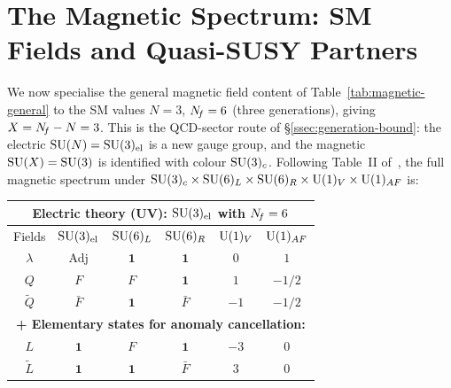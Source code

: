 \documentclass[11pt,a4paper]{article}
\begin{document}
\section{The Magnetic Spectrum: SM Fields and Quasi-SUSY Partners}
\label{sec:magnetic-spectrum}

We now specialise the general magnetic field content of
Table~\ref{tab:magnetic-general} to the SM values $N = 3$, $N_{\!f} = 6$
(three generations), giving $X = N_{\!f} - N = 3$.  This is the QCD-sector
route of \S\ref{ssec:generation-bound}: the electric
$\mathrm{SU}(N) = \mathrm{SU}(3)_{\mathrm{el}}$ is a new gauge group, and the magnetic
$\mathrm{SU}(X) = \mathrm{SU}(3)$ is identified with colour $\mathrm{SU}(3)_c$.
Following Table~II of~\cite{CacciapagliaSannino2024}, the full
magnetic spectrum under $\mathrm{SU}(3)_c \times \mathrm{SU}(6)_L \times \mathrm{SU}(6)_R
\times \mathrm{U}(1)_V \times \mathrm{U}(1)_{AF}$ is:

\begin{center}
\renewcommand{\arraystretch}{1.3}
\begin{tabular}{c c c c c c}
\toprule
\multicolumn{6}{c}{\textbf{Electric theory (UV): $\mathrm{SU}(3)_{\mathrm{el}}$ with $N_{\!f} = 6$}} \\
\midrule
Fields & $\mathrm{SU}(3)_{\mathrm{el}}$ & $\mathrm{SU}(6)_L$ & $\mathrm{SU}(6)_R$ & $\mathrm{U}(1)_V$ & $\mathrm{U}(1)_{AF}$ \\
\midrule
$\lambda$ & Adj & $\mathbf{1}$ & $\mathbf{1}$ & $0$ & $1$ \\
$Q$       & $F$ & $F$ & $\mathbf{1}$ & $1$  & $-1/2$ \\
$\widetilde{Q}$ & $\bar{F}$ & $\mathbf{1}$ & $\bar{F}$ & $-1$ & $-1/2$ \\
\midrule
\multicolumn{6}{c}{\textbf{+ Elementary states for anomaly cancellation:}} \\
$L$   & $\mathbf{1}$ & $F$ & $\mathbf{1}$ & $-3$ & $0$ \\
$\widetilde{L}$ & $\mathbf{1}$ & $\mathbf{1}$ & $\bar{F}$ & $3$ & $0$ \\
\bottomrule
\end{tabular}
\label{tab:electric-SM}
\end{center}
\end{document}
